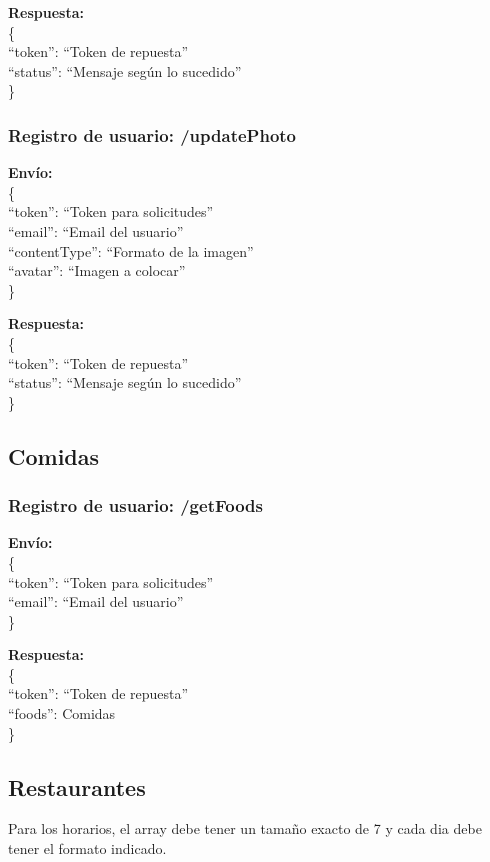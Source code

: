 \documentclass[12pt,letterpaper]{article}
\begin{document}
\noindent
\textbf{Respuesta: }\\
\noindent
\{ \\
``token'': ``Token de repuesta'' \\
``status'': ``Mensaje según lo sucedido'' \\
\}

\subsubsection{Registro de usuario: /updatePhoto}
\noindent
\textbf{Envío: }\\
\noindent
\{ \\
``token'': ``Token para solicitudes'' \\
``email'': ``Email del usuario'' \\
``contentType'': ``Formato de la imagen'' \\
``avatar'': ``Imagen a colocar'' \\
\}

\noindent
\textbf{Respuesta: }\\
\noindent
\{ \\
``token'': ``Token de repuesta'' \\
``status'': ``Mensaje según lo sucedido'' \\
\}

\subsection{Comidas}
\subsubsection{Registro de usuario: /getFoods}
\noindent
\textbf{Envío: }\\
\noindent
\{ \\
``token'': ``Token para solicitudes'' \\
``email'': ``Email del usuario'' \\
\}

\noindent
\textbf{Respuesta: }\\
\noindent
\{ \\
``token'': ``Token de repuesta'' \\
``foods'': Comidas \\
\}

\subsection{Restaurantes}
Para los horarios, el array debe tener un tamaño exacto de 7 y cada dia debe tener el formato indicado.
\end{document}
